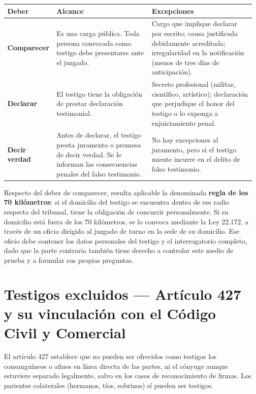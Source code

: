 \documentclass[12pt,oneside]{book}
\begin{document}
\begin{table}[H]
\centering
\begin{tabularx}{\textwidth}{
    >{\raggedright\arraybackslash}p{}
    >{\raggedright\arraybackslash}X
    >{\raggedright\arraybackslash}X
}
\toprule
\textbf{Deber} & \textbf{Alcance} & \textbf{Excepciones} \\
\midrule
\textbf{Comparecer} & Es una carga pública. Toda persona convocada como testigo debe presentarse ante el juzgado. & Cargo que implique declarar por escrito; causa justificada debidamente acreditada; irregularidad en la notificación (menos de tres días de anticipación). \\
\textbf{Declarar} & El testigo tiene la obligación de prestar declaración testimonial. & Secreto profesional (militar, científico, artístico); declaración que perjudique el honor del testigo o lo exponga a enjuiciamiento penal. \\
\textbf{Decir verdad} & Antes de declarar, el testigo presta juramento o promesa de decir verdad. Se le informan las consecuencias penales del falso testimonio. & No hay excepciones al juramento, pero si el testigo miente incurre en el delito de falso testimonio. \\
\bottomrule
\end{tabularx}
\end{table}

\begin{important}
Respecto del deber de comparecer, resulta aplicable la denominada \textbf{regla de los 70 kilómetros}: si el domicilio del testigo se encuentra dentro de ese radio respecto del tribunal, tiene la obligación de concurrir personalmente. Si su domicilio está fuera de los 70 kilómetros, se lo convoca mediante la Ley 22.172, a través de un oficio dirigido al juzgado de turno en la sede de su domicilio. Ese oficio debe contener los datos personales del testigo y el interrogatorio completo, dado que la parte contraria también tiene derecho a controlar este medio de prueba y a formular sus propias preguntas.
\end{important}

\section{Testigos excluidos --- Artículo 427 y su vinculación con el Código Civil y Comercial}

El artículo 427 establece que no pueden ser ofrecidos como testigos los consanguíneos o afines en línea directa de las partes, ni el cónyuge aunque estuviere separado legalmente, salvo en los casos de reconocimiento de firmas. Los parientes colaterales (hermanos, tíos, sobrinos) sí pueden ser testigos.
\end{document}
